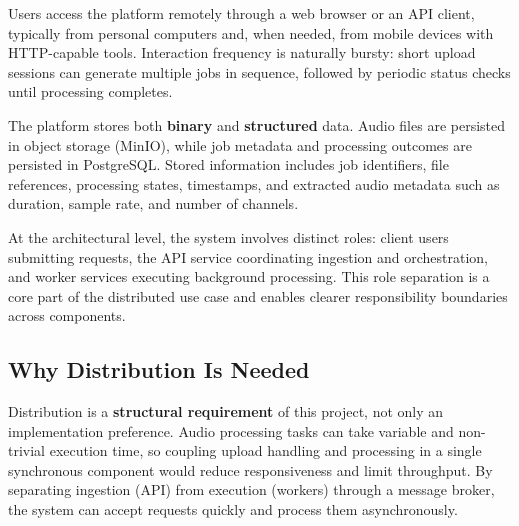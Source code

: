 \documentclass{scrartcl}
\begin{document}
Users access the platform remotely through a web browser or an API client, typically from personal computers and, when needed, from mobile devices with HTTP-capable tools.
Interaction frequency is naturally bursty: short upload sessions can generate multiple jobs in sequence, followed by periodic status checks until processing completes.

The platform stores both \textbf{binary} and \textbf{structured} data.
Audio files are persisted in object storage (MinIO), while job metadata and processing outcomes are persisted in PostgreSQL.
Stored information includes job identifiers, file references, processing states, timestamps, and extracted audio metadata such as duration, sample rate, and number of channels.

At the architectural level, the system involves distinct roles: client users submitting requests, the API service coordinating ingestion and orchestration, and worker services executing background processing.
This role separation is a core part of the distributed use case and enables clearer responsibility boundaries across components.

\subsection*{Why Distribution Is Needed}


Distribution is a \textbf{structural requirement} of this project, not only an implementation preference.
Audio processing tasks can take variable and non-trivial execution time, so coupling upload handling and processing in a single synchronous component would reduce responsiveness and limit throughput.
By separating ingestion (API) from execution (workers) through a message broker, the system can accept requests quickly and process them asynchronously.
\end{document}
